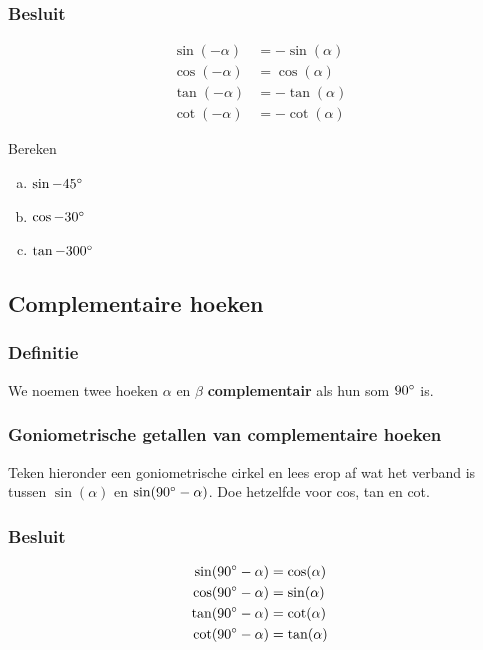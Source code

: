 \documentclass[a4paper,12pt]{article}
\begin{document}
\subsubsection*{Besluit}
\begin{align*}
  \sin(-\alpha)&=-\sin(\alpha)\\
  \cos(-\alpha)&=\cos(\alpha)\\
  \tan(-\alpha)&=-\tan(\alpha)\\
  \cot(-\alpha)&=-\cot(\alpha)
\end{align*}

\begin{oefening}
Bereken
\begin{enumerate}[(a)]
  \item $\sin-45^\circ$
  \item $\cos-30^\circ$
  \item $\tan-300^\circ$
\end{enumerate}
\end{oefening}

\pagebreak
\subsection{Complementaire hoeken}

\subsubsection*{Definitie}
We noemen twee hoeken $\alpha$ en $\beta$ \textbf{complementair} als hun som $90^\circ$ is.

\subsubsection*{Goniometrische getallen van complementaire hoeken}
Teken hieronder een goniometrische cirkel en lees erop af wat het verband is tussen $\sin(\alpha)$ en $\sin(90^\circ-\alpha)$. Doe hetzelfde voor cos, tan en cot.
\vspace*{7cm}

\subsubsection*{Besluit}
\begin{align*}
  \sin(90^\circ-\alpha)&=\cos(\alpha)\\
  \cos(90^\circ-\alpha)&=\sin(\alpha)\\
  \tan(90^\circ-\alpha)&=\cot(\alpha)\\
  \cot(90^\circ-\alpha)&=\tan(\alpha)
\end{align*}
\end{document}
